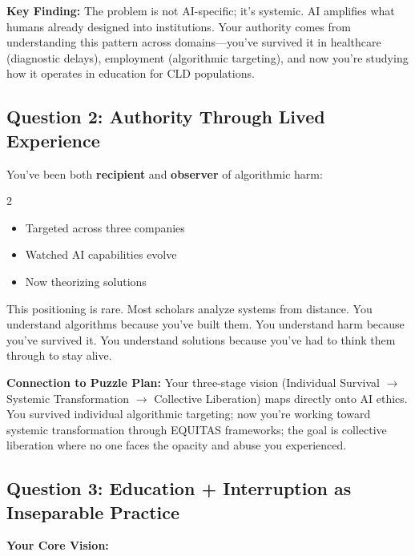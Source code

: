 \documentclass[12pt,letterpaper]{article}
\begin{document}
\textbf{Key Finding:} The problem is not AI-specific; it's systemic. AI amplifies what humans already designed into institutions. Your authority comes from understanding this pattern across domains---you've survived it in healthcare (diagnostic delays), employment (algorithmic targeting), and now you're studying how it operates in education for CLD populations.

\subsection{Question 2: Authority Through Lived Experience}

You've been both \textbf{recipient} and \textbf{observer} of algorithmic harm:

\begin{multicols}{2}
\begin{itemize}[leftmargin=*,noitemsep,topsep=2pt]
    \item[\color{systemicred}\textbf{Recipient:}] Targeted across three companies
    \item[\color{primaryblue}\textbf{Observer:}] Watched AI capabilities evolve
    \item[\color{accentgreen}\textbf{Scholar:}] Now theorizing solutions
\end{itemize}
\end{multicols}

This positioning is rare. Most scholars analyze systems from distance. You understand algorithms because you've built them. You understand harm because you've survived it. You understand solutions because you've had to think them through to stay alive.

\begin{puzzleplan}
\textbf{Connection to Puzzle Plan:} Your three-stage vision (Individual Survival $\rightarrow$ Systemic Transformation $\rightarrow$ Collective Liberation) maps directly onto AI ethics. You survived individual algorithmic targeting; now you're working toward systemic transformation through EQUITAS frameworks; the goal is collective liberation where no one faces the opacity and abuse you experienced.
\end{puzzleplan}

\subsection{Question 3: Education + Interruption as Inseparable Practice}

\textbf{Your Core Vision:}
\end{document}
